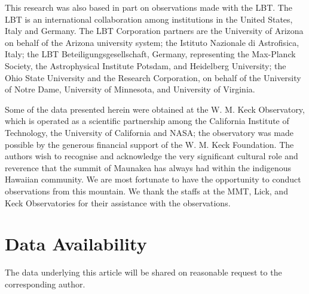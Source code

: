 \documentclass[fleqn,usenatbib,useAMS]{mnras}
\begin{document}
This research was also
based in part on observations made with the LBT. The LBT is an
international collaboration among institutions in the United States,
Italy and Germany. The LBT Corporation partners are the University
of Arizona on behalf of the Arizona university system; the Istituto
Nazionale di Astrofisica, Italy; the LBT Beteiligungsgesellschaft,
Germany, representing the Max-Planck Society, the Astrophysical
Institute Potsdam, and Heidelberg University; the Ohio State University
and the Research Corporation, on behalf of the University of
Notre Dame, University of Minnesota, and University of Virginia.

Some of the data presented herein were obtained at the W. M. Keck
Observatory, which is operated as a scientific partnership among
the California Institute of Technology, the University of California
and NASA; the observatory was made possible by the generous
financial support of the W. M. Keck Foundation. The authors wish
to recognise and acknowledge the very significant cultural role and
reverence that the summit of Maunakea has always had within the
indigenous Hawaiian community. We are most fortunate to have the
opportunity to conduct observations from this mountain.
We thank the staffs at the MMT, Lick, and Keck Observatories for
their assistance with the observations.

\section*{Data Availability}

The data underlying this article will be shared on reasonable request
to the corresponding author.










\bsp	%
\label{lastpage}
\end{document}
